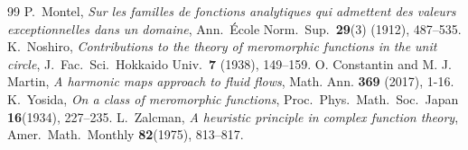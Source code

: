 \documentclass[10pt,a4paper]{amsart}
\begin{document}
\begin{thebibliography}{99}
 P.~Montel, \emph{Sur les familles de fonctions analytiques qui admettent des valeurs exceptionnelles dans un domaine}, Ann.\ \'Ecole Norm.\ Sup.\ \textbf{29}(3) (1912), 487--535.
 K.~Noshiro, \emph{Contributions to the theory of meromorphic functions in the unit circle}, J.\ Fac.\ Sci.\ Hokkaido Univ.\ \textbf{7} (1938), 149--159.
 O. Constantin and M. J. Martin, \emph{A harmonic maps approach to fluid flows}, Math. Ann. \textbf{369} (2017), 1-16.
 K.~Yosida, \emph{On a class of meromorphic functions}, Proc.\ Phys.\ Math.\ Soc.\ Japan \textbf{16}(1934), 227--235.
 L.~Zalcman, \emph{A heuristic principle in complex function theory}, Amer.\ Math.\ Monthly \textbf{82}(1975), 813--817.
\end{thebibliography}
\end{document}
